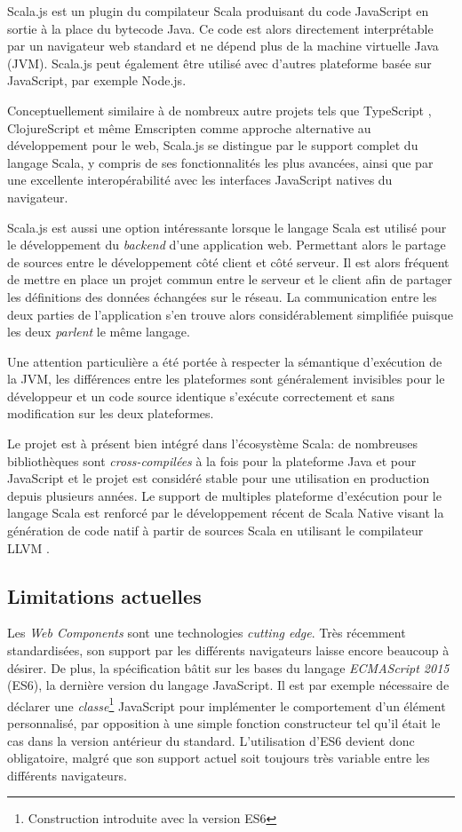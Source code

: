 Scala.js est un plugin du compilateur Scala produisant du code JavaScript en sortie à la place du bytecode Java. Ce code est alors directement interprétable par un navigateur web standard et ne dépend plus de la machine virtuelle Java (JVM). Scala.js peut également être utilisé avec d'autres plateforme basée sur JavaScript, par exemple Node.js.

Conceptuellement similaire à de nombreux autre projets tels que TypeScript \cite{typescript}, ClojureScript \cite{clojure-script} et même Emscripten \cite{emscripten} comme approche alternative au développement pour le web, Scala.js se distingue par le support complet du langage Scala, y compris de ses fonctionnalités les plus avancées, ainsi que par une excellente interopérabilité avec les interfaces JavaScript natives du navigateur.

Scala.js est aussi une option intéressante lorsque le langage Scala est utilisé pour le développement du \emph{backend} d'une application web. Permettant alors le partage de sources entre le développement côté client et côté serveur. Il est alors fréquent de mettre en place un projet commun entre le serveur et le client afin de partager les définitions des données échangées sur le réseau. La communication entre les deux parties de l'application s'en trouve alors considérablement simplifiée puisque les deux \emph{parlent} le même langage.

Une attention particulière a été portée à respecter la sémantique d'exécution de la JVM, les différences entre les plateformes sont généralement invisibles pour le développeur et un code source identique s'exécute correctement et sans modification sur les deux plateformes.

Le projet est à présent bien intégré dans l'écosystème Scala: de nombreuses bibliothèques sont \emph{cross-compilées} à la fois pour la plateforme Java et pour JavaScript et le projet est considéré stable pour une utilisation en production depuis plusieurs années. Le support de multiples plateforme d'exécution pour le langage Scala est renforcé par le développement récent de Scala Native \cite{scalanative} visant la génération de code natif à partir de sources Scala en utilisant le compilateur LLVM \cite{llvm}.

\subsection{Limitations actuelles}

Les \emph{Web Components} sont une technologies \emph{cutting edge}. Très récemment standardisées, son support par les différents navigateurs laisse encore beaucoup à désirer. De plus, la spécification bâtit sur les bases du langage \emph{ECMAScript 2015} (ES6), la dernière version du langage JavaScript. Il est par exemple nécessaire de déclarer une \emph{classe}\footnote{Construction introduite avec la version ES6} JavaScript pour implémenter le comportement d'un élément personnalisé, par opposition à une simple fonction constructeur tel qu'il était le cas dans la version antérieur du standard. L'utilisation d'ES6 devient donc obligatoire, malgré que son support actuel soit toujours très variable entre les différents navigateurs.

